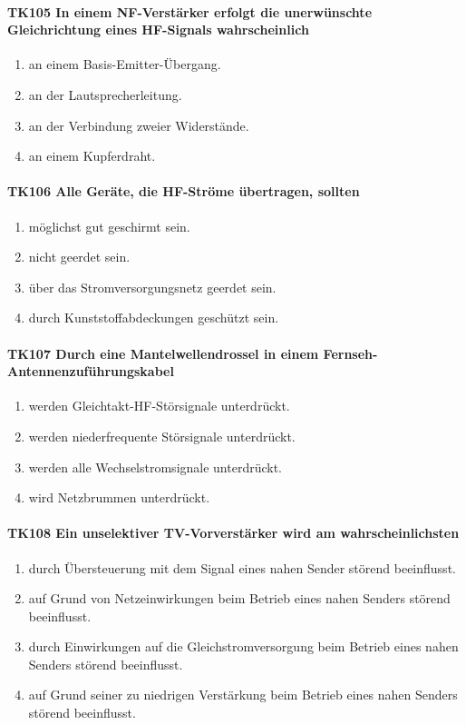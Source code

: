 \documentclass[8pt]{article}
\begin{document}
\paragraph*{TK105 In einem NF-Verstärker erfolgt die unerwünschte Gleichrichtung eines HF-Signals wahrscheinlich}
\begin{enumerate}[nolistsep,label=\Alph*]
\item an einem Basis-Emitter-Übergang.
\item an der Lautsprecherleitung.
\item an der Verbindung zweier Widerstände.
\item an einem Kupferdraht.
\end{enumerate}

\paragraph*{TK106 Alle Geräte, die HF-Ströme übertragen, sollten} 
\begin{enumerate}[nolistsep,label=\Alph*]
\item möglichst gut geschirmt sein.
\item nicht geerdet sein.
\item über das Stromversorgungsnetz geerdet sein.
\item durch Kunststoffabdeckungen geschützt sein.
\end{enumerate}

\paragraph*{TK107 Durch eine Mantelwellendrossel in einem Fernseh-Antennenzuführungskabel}
\begin{enumerate}[nolistsep,label=\Alph*]
\item werden Gleichtakt-HF-Störsignale unterdrückt.
\item werden niederfrequente Störsignale unterdrückt.
\item werden alle Wechselstromsignale unterdrückt.
\item wird Netzbrummen unterdrückt.
\end{enumerate}

\paragraph*{TK108 Ein unselektiver TV-Vorverstärker wird am wahrscheinlichsten}
\begin{enumerate}[nolistsep,label=\Alph*]
\item durch Übersteuerung mit dem Signal eines nahen Sender störend beeinflusst.
\item auf Grund von Netzeinwirkungen beim Betrieb eines nahen Senders störend beeinflusst.
\item durch Einwirkungen auf die Gleichstromversorgung beim Betrieb eines nahen Senders störend beeinflusst.
\item auf Grund seiner zu niedrigen Verstärkung beim Betrieb eines nahen Senders störend beeinflusst.
\end{enumerate}
\end{document}
